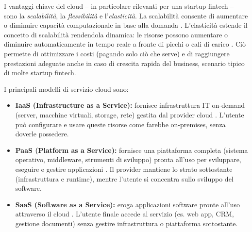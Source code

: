 \documentclass[a4paper,12pt]{report}
\begin{document}
I vantaggi chiave del cloud – in particolare rilevanti per una startup fintech – sono la \textit{scalabilità}, la \textit{flessibilità} e l'\textit{elasticità}. La scalabilità consente di aumentare o diminuire capacità computazionale in base alla domanda \cite{digitalocean-cloud}. L'elasticità estende il concetto di scalabilità rendendola dinamica: le risorse possono aumentare o diminuire automaticamente in tempo reale a fronte di picchi o cali di carico \cite{geeksforgeeks_scalability}. Ciò permette di ottimizzare i costi (pagando solo ciò che serve) e di raggiungere prestazioni adeguate anche in caso di crescita rapida del business, scenario tipico di molte startup fintech.

I principali modelli di servizio cloud sono:
\begin{itemize}
    \item \textbf{IaaS (Infrastructure as a Service):} fornisce infrastruttura IT on-demand (server, macchine virtuali, storage, rete) gestita dal provider cloud \cite{ibm_iaas}. L'utente può configurare e usare queste risorse come farebbe on-premises, senza doverle possedere.
    \item \textbf{PaaS (Platform as a Service):} fornisce una piattaforma completa (sistema operativo, middleware, strumenti di sviluppo) pronta all'uso per sviluppare, eseguire e gestire applicazioni \cite{ibm-cloud}. Il provider mantiene lo strato sottostante (infrastruttura e runtime), mentre l'utente si concentra sullo sviluppo del software.
    \item \textbf{SaaS (Software as a Service):} eroga applicazioni software pronte all’uso attraverso il cloud \cite{ibm-cloud}. L’utente finale accede al servizio (es. web app, CRM, gestione documenti) senza gestire infrastruttura o piattaforma sottostante.
\end{itemize}
\end{document}

